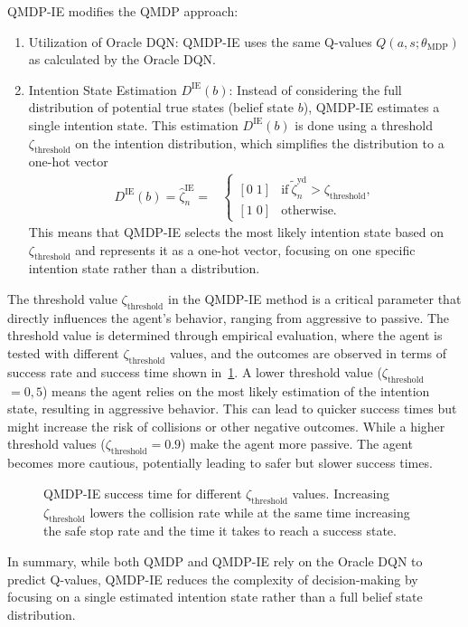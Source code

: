 QMDP-IE modifies the QMDP approach:
\begin{enumerate}
	\item Utilization of Oracle DQN: QMDP-IE uses the same Q-values $Q(a,s;\theta_\mathrm{MDP})$ as calculated by the Oracle DQN.
	\item Intention State Estimation $D^\mathrm{IE}(b)$: Instead of considering the full distribution of potential true states (belief state $b$), QMDP-IE estimates a single intention state. This estimation $D^\mathrm{IE}(b)$ is done using a threshold $\zeta_\mathrm{threshold}$ on the intention distribution, which simplifies the distribution to a one-hot vector
	\begin{align}
		D^\mathrm{IE}(b) = \hat{\zeta}^\mathrm{IE}_n = & \begin{cases}
		[0 \; 1] & \text{if} \ \tilde{\zeta}_n^\text{yd} > \zeta_\text{threshold},\\
		[1 \; 0] & \text{otherwise.}
		\label{eq:IE_i}
		\end{cases} 
	\end{align}
	This means that QMDP-IE selects the most likely intention state based on $\zeta_\mathrm{threshold}$ and represents it as a one-hot vector, focusing on one specific intention state rather than a distribution.
\end{enumerate}
The threshold value $\zeta_\mathrm{threshold}$ in the QMDP-IE method is a critical parameter that directly influences the agent's behavior, ranging from aggressive to passive. The threshold value is determined through empirical evaluation, where the agent is tested with different $\zeta_\mathrm{threshold}$ values, and the outcomes are observed in terms of success rate and success time shown in~\ref{fig:thesis_intent_threshold}.
A lower threshold value ($\zeta_\mathrm{threshold}$ $= 0,5$) means the agent relies on the most likely estimation of the intention state, resulting in aggressive behavior. This can lead to quicker success times but might increase the risk of collisions or other negative outcomes. While a higher threshold values ($\zeta_\mathrm{threshold}=0.9$) make the agent more passive. The agent becomes more cautious, potentially leading to safer but slower success times.
\begin{figure}[ht]
	\centering
			
			\vspace{-0.8cm}
			\caption{QMDP-IE success time for different $\zeta_\mathrm{threshold}$ values. Increasing $\zeta_\mathrm{threshold}$ lowers the collision rate while at the same time increasing the safe stop rate and the time it takes to reach a success state.}
	\label{fig:thesis_intent_threshold}
\end{figure}
In summary, while both QMDP and QMDP-IE rely on the Oracle DQN to predict Q-values, QMDP-IE reduces the complexity of decision-making by focusing on a single estimated intention state rather than a full belief state distribution.

